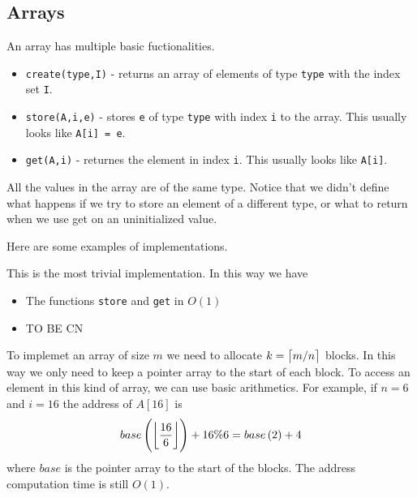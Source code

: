 \documentclass[11pt,a4paper]{article}
\begin{document}
\subsection{Arrays}

\begin{example}[Array]
    An array has multiple basic fuctionalities.
    \begin{itemize}
        \item \texttt{create(type,I)} - returns an array of elements of type
          \texttt{type} with the index set \texttt I.
        \item \texttt{store(A,i,e)} - stores \texttt e of type \texttt{type}
          with index \texttt i to the array.
          This usually looks like \texttt{A[i] = e}.
        \item \texttt{get(A,i)} - returnes the element in index \texttt i.
          This usually looks like \texttt{A[i]}.
    \end{itemize}
\end{example}

All the values in the array are of the same type.
Notice that we didn't define what happens if we try to store an element
of a different type, or what to return when we use get on an uninitialized
value.

Here are some examples of implementations.

\begin{example}
  This is the most trivial implementation.
  In this way we have
  \begin{itemize}
    \item The functions \texttt{store} and \texttt{get} in $O(1)$
    \item TO BE CN
  \end{itemize}
\end{example}

\begin{example}
  To implemet an array of size $m$ we need to allocate $k = \left\lceil m / n \right\rceil$
  blocks.
  In this way we only need to keep a pointer array to the start of each block.
  To access an element in this kind of array, we can use basic arithmetics.
  For example, if $n = 6$ and $i = 16$ the address of $A[16]$ is
  \[
    base\del{\floor{\frac{16}{6}}} + 16 \% 6 = base\del{2} + 4
  \]
  where $base$ is the pointer array to the start of the blocks.
  The address computation time is still $O(1)$.
\end{example}
\end{document}
